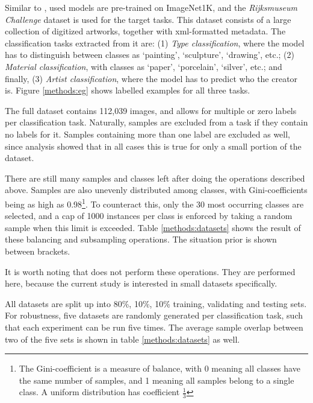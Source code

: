 Similar to \citeauthor{sabatelli2018deep}, used models are pre-trained on ImageNet1K, and the \textit{Rijksmuseum Challenge} dataset \citep{mensink14icmr} is used for the target tasks. This dataset consists of a large collection of digitized artworks, together with xml-formatted metadata. The classification tasks extracted from it are: (1) \textit{Type classification}, where the model has to distinguish between classes as `painting', `sculpture', `drawing', etc.; (2) \textit{Material classification}, with classes as `paper', `porcelain', `silver', etc.; and finally, (3) \textit{Artist classification}, where the model has to predict who the creator is. Figure \ref{methods:eg} shows labelled examples for all three tasks.

The full dataset contains 112,039 images, and allows for multiple or zero labels per classification task. Naturally, samples are excluded from a task if they contain no labels for it. Samples containing more than one label are excluded as well, since analysis showed that in all cases this is true for only a small portion of the dataset.%

There are still many samples and classes left after doing the operations described above. Samples are also unevenly distributed among classes, with Gini-coefficients being as high as 0.98\footnote{The Gini-coefficient is a measure of balance, with 0 meaning all classes have the same number of samples, and 1 meaning all samples belong to a single class. A uniform distribution has coefficient $\frac{1}{3}$}. To counteract this, only the 30 most occurring classes are selected, and a cap of 1000 instances per class is enforced by taking a random sample when this limit is exceeded. Table \ref{methods:datasets} shows the result of these balancing and subsampling operations. The situation prior is shown between brackets.

It is worth noting that \citeauthor{sabatelli2018deep} does not perform these operations. They are performed here, because the current study is interested in small datasets specifically.

All datasets are split up into 80\%, 10\%, 10\% training, validating and testing sets. For robustness, five datasets are randomly generated per classification task, such that each experiment can be run five times. The average sample overlap between two of the five sets is shown in table \ref{methods:datasets} as well.

